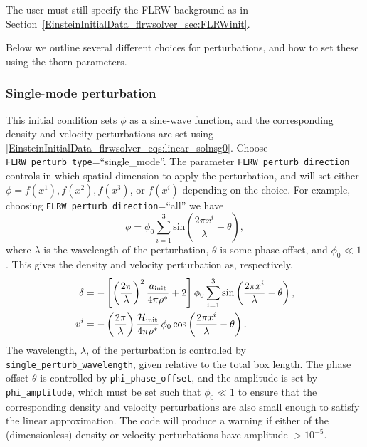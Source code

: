 The user must still specify the FLRW background as in Section~\ref{EinsteinInitialData_flrwsolver_sec:FLRWinit}.

Below we outline several different choices for perturbations, and how to set these using the thorn parameters.

\subsubsection{Single-mode perturbation}\label{EinsteinInitialData_flrwsolver_sec:singlemode_ics}

This initial condition sets $\phi$ as a sine-wave function, and the corresponding density and velocity perturbations are set using \eqref{EinsteinInitialData_flrwsolver_eqs:linear_solnsg0}. Choose \texttt{FLRW\_perturb\_type}=``single\_mode''. The parameter \texttt{FLRW\_perturb\_direction} controls in which spatial dimension to apply the perturbation, and will set either $\phi=f(x^1),f(x^2),f(x^3)$, or $f(x^i)$ depending on the choice. For example, choosing \texttt{FLRW\_perturb\_direction}=``all'' we have
\begin{equation}\label{EinsteinInitialData_flrwsolver_eq:phi}
	\phi = \phi_{0} \sum_{i=1}^{3} \mathrm{sin}\left(\frac{2\pi x^{i}}{\lambda} - \theta \right),
\end{equation}
where $\lambda$ is the wavelength of the perturbation, $\theta$ is some phase offset, and $\phi_0\ll1$. This gives the density and velocity perturbation as, respectively, \cite{EinsteinInitialData_flrwsolver_macpherson2017}
\begin{align} 
	\delta &= - \left[ \left(\frac{2\pi}{\lambda}\right)^{2} \frac{a_{\mathrm{init}}}{4\pi\rho^{*}} + 2\right] \phi_{0} \sum_{i=1}^{3} \mathrm{sin}\left(\frac{2\pi x^{i}}{\lambda} - \theta \right),\label{EinsteinInitialData_flrwsolver_eq:initial_delta}\\
	v^{i} &= -\left(\frac{2\pi}{\lambda}\right)\frac{\mathcal{H}_{\rm init}}{4\pi\rho^{*}}\, \phi_{0}\, \mathrm{cos}\left(\frac{2\pi x^{i}}{\lambda} - \theta \right). \label{EinsteinInitialData_flrwsolver_eq:initial_deltav}
\end{align}
The wavelength, $\lambda$, of the perturbation is controlled by \texttt{single\_perturb\_wavelength}, given relative to the total box length.
 The phase offset $\theta$ is controlled by {\tt phi\_phase\_offset}, and the amplitude is set by \texttt{phi\_amplitude}, which must be set such that $\phi_0\ll1$
 to ensure that the corresponding density and velocity perturbations are also small enough to satisfy the linear approximation. The code will produce a warning if either of the (dimensionless) density or velocity perturbations have amplitude $> 10^{-5}$. 

